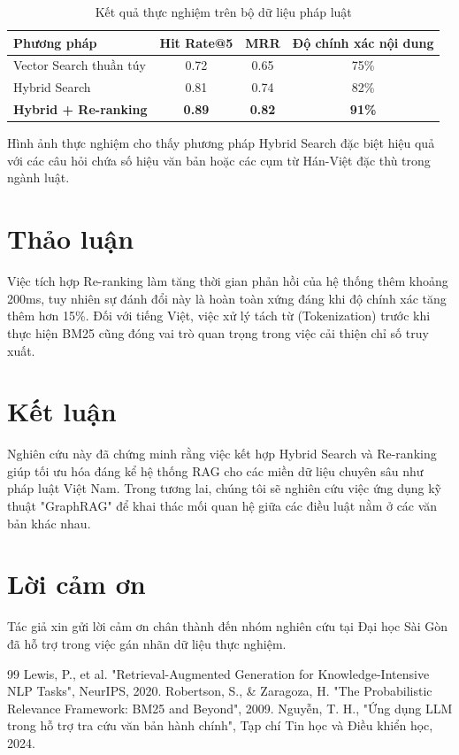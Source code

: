 \documentclass[11pt,a4paper]{article}
\begin{document}
\begin{table}[h]
\centering
\caption{Kết quả thực nghiệm trên bộ dữ liệu pháp luật}
\label{table:rag_results}
\vspace{0.3cm}
\begin{tabular}{lccc}
\toprule
\textbf{Phương pháp} & \textbf{Hit Rate@5} & \textbf{MRR} & \textbf{Độ chính xác nội dung} \\
\midrule
Vector Search thuần túy & 0.72 & 0.65 & 75\% \\
Hybrid Search & 0.81 & 0.74 & 82\% \\
\textbf{Hybrid + Re-ranking} & \textbf{0.89} & \textbf{0.82} & \textbf{91\%} \\
\bottomrule
\end{tabular}
\end{table}

Hình ảnh thực nghiệm cho thấy phương pháp Hybrid Search đặc biệt hiệu quả với các câu hỏi chứa số hiệu văn bản hoặc các cụm từ Hán-Việt đặc thù trong ngành luật.

\section{Thảo luận}
Việc tích hợp Re-ranking làm tăng thời gian phản hồi của hệ thống thêm khoảng 200ms, tuy nhiên sự đánh đổi này là hoàn toàn xứng đáng khi độ chính xác tăng thêm hơn 15\%. Đối với tiếng Việt, việc xử lý tách từ (Tokenization) trước khi thực hiện BM25 cũng đóng vai trò quan trọng trong việc cải thiện chỉ số truy xuất.

\section{Kết luận}
Nghiên cứu này đã chứng minh rằng việc kết hợp Hybrid Search và Re-ranking giúp tối ưu hóa đáng kể hệ thống RAG cho các miền dữ liệu chuyên sâu như pháp luật Việt Nam. Trong tương lai, chúng tôi sẽ nghiên cứu việc ứng dụng kỹ thuật "GraphRAG" để khai thác mối quan hệ giữa các điều luật nằm ở các văn bản khác nhau.

\section*{Lời cảm ơn}
Tác giả xin gửi lời cảm ơn chân thành đến nhóm nghiên cứu tại Đại học Sài Gòn đã hỗ trợ trong việc gán nhãn dữ liệu thực nghiệm.

\begin{thebibliography}{99}
 Lewis, P., et al. "Retrieval-Augmented Generation for Knowledge-Intensive NLP Tasks", NeurIPS, 2020.
 Robertson, S., \& Zaragoza, H. "The Probabilistic Relevance Framework: BM25 and Beyond", 2009.
 Nguyễn, T. H., "Ứng dụng LLM trong hỗ trợ tra cứu văn bản hành chính", Tạp chí Tin học và Điều khiển học, 2024.
\end{thebibliography}
\end{document}
